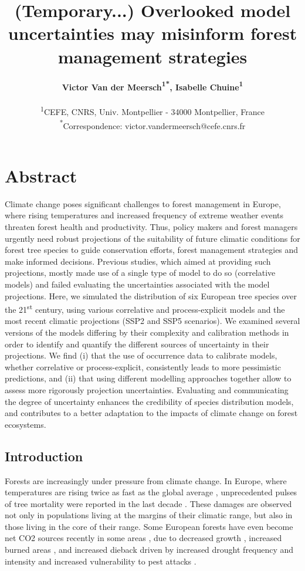 \documentclass[letterpaper,8pt]{extarticle}  %
\title{(Temporary...) Overlooked model uncertainties may misinform forest management strategies}
\author{%
\textbf{Victor Van der Meersch\textcolor{Accent}{\textsuperscript{1*}}, %
Isabelle Chuine\textcolor{Accent}{\textsuperscript{1}} %
}\\
\begin{small}\textcolor{Accent}{\textsuperscript{1}}CEFE, CNRS, Univ. Montpellier - 34000 Montpellier, France \\ 
\textcolor{Accent}{\textsuperscript{*}}Correspondence: \textcolor{Accent}{victor.vandermeersch@cefe.cnrs.fr} \\ \end{small}
}
\date{}
\begin{document}
\maketitle

\section*{Abstract}

\begin{doublespacing}
\begin{linenumbers}

Climate change poses significant challenges to forest management in Europe, where rising temperatures and increased frequency of extreme weather events threaten forest health and productivity. Thus, policy makers and forest managers urgently need robust projections of the suitability of future climatic conditions for forest tree species to guide conservation efforts, forest management strategies and make informed decisions. Previous studies, which aimed at providing such projections, mostly made use of a single type of model to do so (correlative models) and failed evaluating the uncertainties associated with the model projections. Here, we simulated the distribution of six European tree species over the 21\textsuperscript{st} century, using various correlative and process-explicit models and the most recent climatic projections (SSP2 and SSP5 scenarios). We examined several versions of the models differing by their complexity and calibration methods in order to identify and quantify the different sources of uncertainty in their projections. We find (i) that the use of occurrence data to calibrate models, whether correlative or process-explicit, consistently leads to more pessimistic predictions, and (ii) that using different modelling approaches together allow to assess more rigorously projection uncertainties. Evaluating and communicating the degree of uncertainty enhances the credibility of species distribution models, and contributes to a better adaptation to the impacts of climate change on forest ecosystems.

\rmfamily


\subsection{Introduction}

Forests are increasingly under pressure from climate change. In Europe, where temperatures are rising twice as fast as the global average \citep{CCCS2024}, unprecedented pulses of tree mortality were reported in the last decade \citep{Senf2020}. These damages are observed not only in populations living at the margins of their climatic range, but also in those living in the core of their range. Some European forests have even become net CO2 sources recently  in some areas \citep{Hadden2016, Karelin2021}, due to decreased growth \citep{Hadden2016, Woude2023}, increased burned areas \citep{Carnicer2022, Kelly2024}, and increased dieback driven by increased drought frequency and intensity and increased vulnerability to pest attacks \citep{Karelin2021, Cienciala2024, Latifovic2024}.


\end{linenumbers}
\end{doublespacing}
\end{document}
